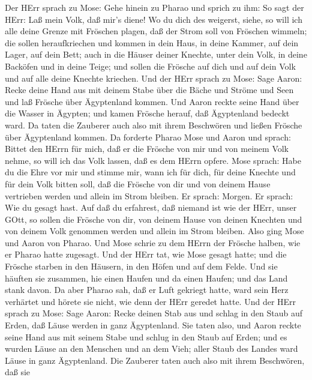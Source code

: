  Der HErr sprach zu Mose: Gehe hinein zu Pharao und sprich
zu ihm: So sagt der HErr: Laß mein Volk, daß mir's diene! 
Wo du dich des weigerst, siehe, so will ich alle deine Grenze mit
Fröschen plagen,  daß der Strom soll von Fröschen wimmeln;
die sollen heraufkriechen und kommen in dein Haus, in deine Kammer, auf
dein Lager, auf dein Bett; auch in die Häuser deiner Knechte, unter dein
Volk, in deine Backöfen und in deine Teige;  und sollen die
Frösche auf dich und auf dein Volk und auf alle deine Knechte kriechen.
 Und der HErr sprach zu Mose: Sage Aaron: Recke deine Hand
aus mit deinem Stabe über die Bäche und Ströme und Seen und laß Frösche
über Ägyptenland kommen.  Und Aaron reckte seine Hand über
die Wasser in Ägypten; und kamen Frösche herauf, daß Ägyptenland bedeckt
ward.  Da taten die Zauberer auch also mit ihrem Beschwören
und ließen Frösche über Ägyptenland kommen.  Da forderte
Pharao Mose und Aaron und sprach: Bittet den HErrn für mich, daß er die
Frösche von mir und von meinem Volk nehme, so will ich das Volk lassen,
daß es dem HErrn opfere.  Mose sprach: Habe du die Ehre vor
mir und stimme mir, wann ich für dich, für deine Knechte und für dein
Volk bitten soll, daß die Frösche von dir und von deinem Hause
vertrieben werden und allein im Strom bleiben.  Er sprach:
Morgen. Er sprach: Wie du gesagt hast. Auf daß du erfahrest, daß niemand
ist wie der HErr, unser GOtt,  so sollen die Frösche von
dir, von deinem Hause von deinen Knechten und von deinem Volk genommen
werden und allein im Strom bleiben.  Also ging Mose und
Aaron von Pharao. Und Mose schrie zu dem HErrn der Frösche halben, wie
er Pharao hatte zugesagt.  Und der HErr tat, wie Mose
gesagt hatte; und die Frösche starben in den Häusern, in den Höfen und
auf dem Felde.  Und sie häuften sie zusammen, hie einen
Haufen und da einen Haufen; und das Land stank davon.  Da
aber Pharao sah, daß er Luft gekriegt hatte, ward sein Herz verhärtet
und hörete sie nicht, wie denn der HErr geredet hatte.  Und
der HErr sprach zu Mose: Sage Aaron: Recke deinen Stab aus und schlag in
den Staub auf Erden, daß Läuse werden in ganz Ägyptenland. 
Sie taten also, und Aaron reckte seine Hand aus mit seinem Stabe und
schlug in den Staub auf Erden; und es wurden Läuse an den Menschen und
an dem Vieh; aller Staub des Landes ward Läuse in ganz Ägyptenland.
 Die Zauberer taten auch also mit ihrem Beschwören, daß sie
